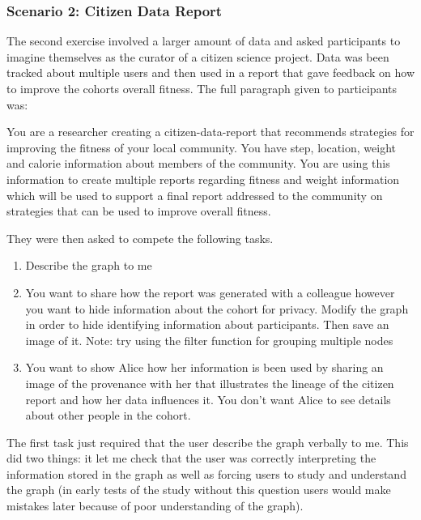 \subsubsection{Scenario 2: Citizen Data Report}
\label{ssub:Scenario 2: Citizen Data Report}

The second exercise involved a larger amount of data and asked participants to imagine themselves as the curator of a citizen science project. Data was been tracked about multiple users and then used in a report that gave feedback on how to improve the cohorts overall fitness. The full paragraph given to participants was:

\begin{absolutelynopagebreak}
\begin{framed}
You are a researcher creating a citizen-data-report that recommends strategies for improving the fitness of your local community. You have step, location, weight and calorie information about members of the community. You are using this information to create multiple reports regarding fitness and weight information which will be used to support a final report addressed to the community on strategies that can be used to improve overall fitness. 
\end{framed}
\end{absolutelynopagebreak}

They were then asked to compete the following tasks. 

\begin{enumerate}
	\item Describe the graph to me
	\item You want to share how the report was generated with a colleague however you want to hide information about the cohort for privacy. Modify the graph in order to hide identifying information about participants. Then save an image of it. Note: try using the filter function for grouping multiple nodes
	\item You want to show Alice how her information is been used by sharing an image of the provenance with her that illustrates the lineage of the citizen report and how her data influences it. You don’t want Alice to see details about other people in the cohort. 
\end{enumerate}

The first task just required that the user describe the graph verbally to me. This did two things: it let me check that the user was correctly interpreting the information stored in the graph as well as forcing users to study and understand the graph (in early tests of the study without this question users would make mistakes later because of poor understanding of the graph).

